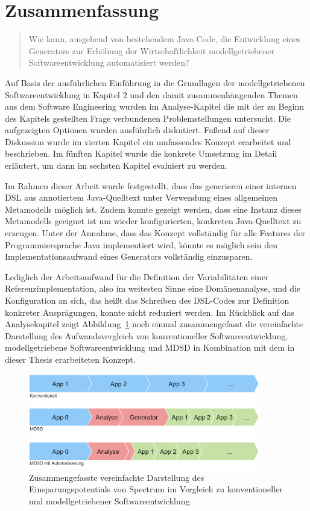 \documentclass[12pt,oneside,a4paper,parskip]{scrbook}
\begin{document}
\section{Zusammenfassung}

\begin{quote}\glqq Wie kann, ausgehend von bestehendem Java-Code, die Entwicklung eines Generators zur Erhöhung der Wirtschaftlichkeit modellgetriebener Softwareentwicklung automatisiert werden?\grqq \end{quote}

Auf Basis der ausführlichen Einführung in die Grundlagen der modellgetriebenen Softwareentwicklung in Kapitel 2 und den damit zusammenhängenden Themen aus dem Software Engineering wurden im Analyse-Kapitel die mit der zu Beginn des Kapitels gestellten Frage verbundenen Problemstellungen untersucht. Die aufgezeigten Optionen wurden ausführlich diskutiert. Fußend auf dieser Diskussion wurde im vierten Kapitel ein umfassendes Konzept erarbeitet und beschrieben. Im fünften Kapitel wurde die konkrete Umsetzung im Detail erläutert, um dann im sechsten Kapitel evaluiert zu werden.

Im Rahmen dieser Arbeit wurde festgestellt, dass das generieren einer internen DSL aus annotiertem Java-Quelltext unter Verwendung eines allgemeinen Metamodells möglich ist. Zudem konnte gezeigt werden, dass eine Instanz dieses Metamodells geeignet ist um wieder konfigurierten, konkreten Java-Quelltext zu erzeugen. Unter der Annahme, dass das Konzept vollständig für alle Features der Programmiersprache Java implementiert wird, könnte es möglich sein den Implementationsaufwand eines Generators vollständig einzusparen.

Lediglich der Arbeitsaufwand für die Definition der Variabilitäten einer Referenzimplementation, also im weitesten Sinne eine Domänenanalyse, und die Konfiguration an sich, das heißt das Schreiben des DSL-Codes zur Definition konkreter Ausprägungen, konnte nicht reduziert werden. Im Rückblick auf das Analysekapitel zeigt Abbildung~\ref{fig:vgl3} noch einmal zusammengefasst die vereinfachte Darstellung des Aufwandsvergleich von konventioneller Softwareentwicklung, modellgetriebene Softwareentwicklung und MDSD in Kombination mit dem in dieser Thesis erarbeiteten Konzept.

\begin{figure}[htbp]
	\centering
	\includegraphics[width=0.9\textwidth]{bilder/vergleich_3}
	\caption{Zusammengefasste vereinfachte Darstellung des Einsparungspotentials von Spectrum im Vergleich zu konventioneller und modellgetriebener Softwareentwicklung.}
	\label{fig:vgl3}
\end{figure}
\end{document}
